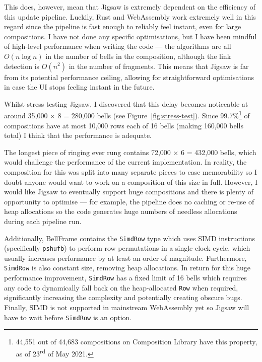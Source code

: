 \documentclass[12pt]{article}
\newcommand{\nth}[2]{#1\textsuperscript{#2}}
\begin{document}
This does, however, mean that Jigsaw is extremely dependent on the efficiency of this update
pipeline.  Luckily, Rust and WebAssembly work extremely well in this regard since the
pipeline is fast enough to reliably feel instant, even for large compositions.  I have not done any
specific optimisations, but I have been mindful of high-level performance when writing the code
--- the algorithms are all $O(n \log n)$ in the number of bells in the composition, although the
link detection is $O(n^2)$ in the number of fragments.  This means that Jigsaw is far from its
potential performance ceiling, allowing for straightforward optimisations in case the UI stops
feeling instant in the future.

Whilst stress testing Jigsaw, I discovered that this delay becomes noticeable at around 35,000
$\times$ 8 = 280,000 bells (see Figure~\ref{fig:stress-test}).  Since 99.7\%\footnote{44,551 out of
44,683 compositions on Composition Library have this property, as of \nth{23}{rd} of May 2021.} of
compositions have at most 10,000 rows each of 16 bells (making 160,000 bells total) I think that the
performance is adequate.

The longest piece of ringing ever rung contains 72,000 $\times$ 6 = 432,000 bells, which would
challenge the performance of the current implementation.  In reality, the composition for this was
split into many separate pieces to ease memorability so I doubt anyone would want to work on a
composition of this size in full.  However, I would like Jigsaw to eventually support huge
compositions and there is plenty of opportunity to optimise --- for example, the pipeline does no
caching or re-use of heap allocations so the code generates huge numbers of needless allocations
during each pipeline run.

Additionally, BellFrame contains the \verb|SimdRow| type which uses SIMD instructions
(specifically \verb|pshufb|) to perform row permutations in a single clock cycle, which usually
increases performance by at least an order of magnitude.  Furthermore, \verb|SimdRow| is also
constant size, removing heap allocations.  In return for this huge performance improvement,
\verb|SimdRow| has a fixed limit of 16 bells which requires any code to dynamically fall back on the
heap-allocated \verb|Row| when required, significantly increasing the complexity and potentially
creating obscure bugs.  Finally, SIMD is not supported in mainstream WebAssembly yet so Jigsaw will
have to wait before \verb|SimdRow| is an option.
\end{document}

